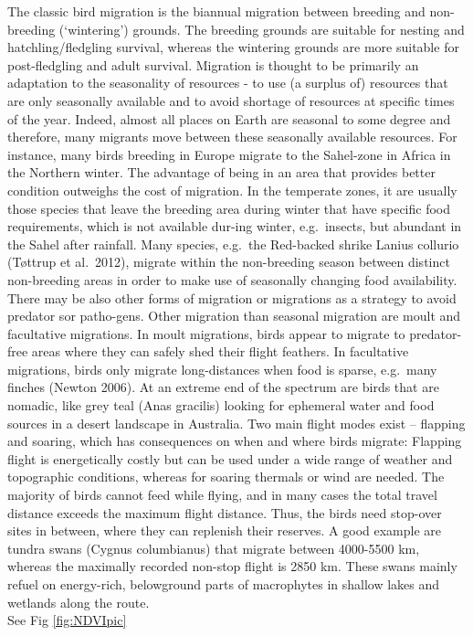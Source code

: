 \documentclass[
]{book}
\begin{document}
The classic bird migration is the biannual migration between breeding and non-breeding (`wintering') grounds. The breeding grounds are suitable for nesting and hatchling/fledgling survival, whereas the wintering grounds are more suitable for post-fledgling and adult survival. Migration is thought to be primarily an adaptation to the seasonality of resources - to use (a surplus of) resources that are only seasonally available and to avoid shortage of resources at specific times of the year.
Indeed, almost all places on Earth are seasonal to some degree and therefore, many migrants move between these seasonally available resources. For instance, many birds breeding in Europe migrate to the Sahel-zone in Africa in the Northern winter. The advantage of being in an area that provides better condition outweighs the cost of migration. In the temperate zones, it are usually those species that leave the breeding area during winter that have specific food requirements, which is not available dur-ing winter, e.g.~insects, but abundant in the Sahel after rainfall. Many species, e.g.~the Red-backed shrike Lanius collurio (Tøttrup et al.~2012), migrate within the non-breeding season between distinct non-breeding areas in order to make use of seasonally changing food availability.\\
There may be also other forms of migration or migrations as a strategy to avoid predator sor patho-gens.
Other migration than seasonal migration are moult and facultative migrations. In moult migrations, birds appear to migrate to predator-free areas where they can safely shed their flight feathers. In facultative migrations, birds only migrate long-distances when food is sparse, e.g.~many finches (Newton 2006). At an extreme end of the spectrum are birds that are nomadic, like grey teal (Anas gracilis) looking for ephemeral water and food sources in a desert landscape in Australia.
Two main flight modes exist -- flapping and soaring, which has consequences on when and where birds migrate: Flapping flight is energetically costly but can be used under a wide range of weather and topographic conditions, whereas for soaring thermals or wind are needed.
The majority of birds cannot feed while flying, and in many cases the total travel distance exceeds the maximum flight distance. Thus, the birds need stop-over sites in between, where they can replenish their reserves. A good example are tundra swans (Cygnus columbianus) that migrate between 4000-5500 km, whereas the maximally recorded non-stop flight is 2850 km. These swans mainly refuel on energy-rich, belowground parts of macrophytes in shallow lakes and wetlands along the route.\\
See Fig \ref{fig:NDVIpic}
\end{document}
